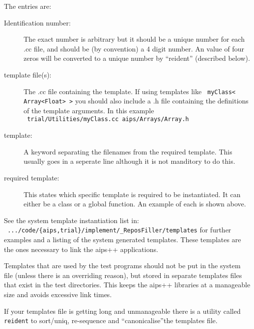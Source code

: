 The entries are:
\begin{description}
\item[Identification number:] The exact number is arbitrary but it
  should be a unique number for each .cc file, and should be (by
  convention) a 4 digit number. An value of four zeros will be
  converted to a unique number by ``reident'' (described below).
\item[template file(s):] The .cc file containing the template. If using
  templates like \texttt{ myClass< Array<Float> >} you should also
  include a .h file containing the definitions of the
  template arguments. In this example \\
  \texttt{ trial/Utilities/myClass.cc aips/Arrays/Array.h}
\item[template:] A keyword separating the filenames from the required
  template. This usually goes in a seperate line although it is not
  manditory to do this.
\item[required template:] This states which specific template is required
  to be instantiated. It can either be a class or a global
  function. An example of each is shown above. 
\end{description}
See the system template instantiation list in: \\
\texttt{ .../code/\{aips,trial\}/implement/\_ReposFiller/templates} 
for further examples and a listing of the system generated 
templates. These templates are the ones necessary to link the aips++
applications.

Templates that are used by the test programs should not be put in the
system file (unless there is an overriding reason), but stored in
separate templates files that exist in the test directories. This keeps
the aips++ libraries at a manageable size and avoids excessive link
times. 

If your templates file is getting long and unmanageable there is a
utility called \texttt{reident} to sort/uniq, re-sequence and
``canonicalise''the templates file.

